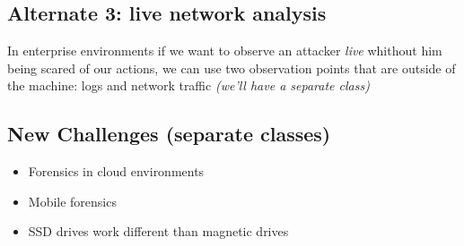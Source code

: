 \subsection{Alternate 3: live network analysis}
    In enterprise environments if we want to observe an attacker \textit{live} whithout him being scared of our actions, we can use two observation points that are outside of the machine: logs and network traffic \textit{(we'll have a separate class)}
\subsection{New Challenges (separate classes)}
    \begin{itemize}
        \item Forensics in cloud environments
        \item Mobile forensics
        \item SSD drives work different than magnetic drives
    \end{itemize}
